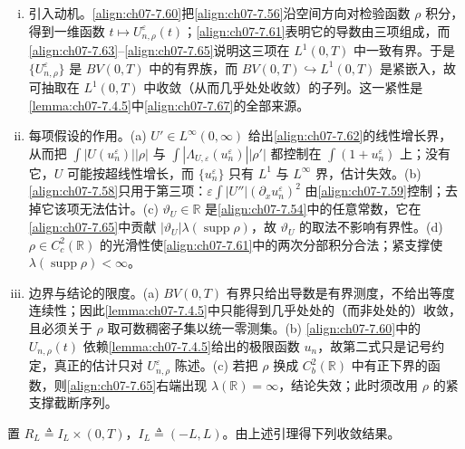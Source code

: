 ﻿\documentclass[../../main.tex]{subfiles}%
\begin{document}
\begin{remark}\label{remark:ch07-7.4.4BV}
\begin{enumerate}[(i)]
\item 引入动机。\eqref{align:ch07-7.60}把\eqref{align:ch07-7.56}沿空间方向对检验函数 $\rho$ 积分，得到一维函数 $t\mapsto U_{n,\rho}^\varepsilon(t)$；\eqref{align:ch07-7.61}表明它的导数由三项组成，而\eqref{align:ch07-7.63}--\eqref{align:ch07-7.65}说明这三项在 $L^1(0,T)$ 中一致有界。于是 $\{U_{n,\rho}^\varepsilon\}$ 是 $BV(0,T)$ 中的有界族，而 $BV(0,T)\hookrightarrow L^1(0,T)$ 是紧嵌入，故可抽取在 $L^1(0,T)$ 中收敛（从而几乎处处收敛）的子列。这一紧性是\cref{lemma:ch07-7.4.5}中\eqref{align:ch07-7.67}的全部来源。
\item 每项假设的作用。(a) $U'\in L^\infty(0,\infty)$ 给出\eqref{align:ch07-7.62}的线性增长界，从而把 $\int|U(u_n^\varepsilon)||\rho|$ 与 $\int|\Lambda_{U,\varepsilon}(u_n^\varepsilon)||\rho'|$ 都控制在 $\int(1+u_n^\varepsilon)$ 上；没有它，$U$ 可能按超线性增长，而 $\{u_n^\varepsilon\}$ 只有 $L^1$ 与 $L^\infty$ 界，估计失效。(b) \eqref{align:ch07-7.58}只用于第三项：$\varepsilon\int|U''|(\partial_xu_n^\varepsilon)^2$ 由\eqref{align:ch07-7.59}控制；去掉它该项无法估计。(c) $\vartheta_U\in\mathbb{R}$ 是\eqref{align:ch07-7.54}中的任意常数，它在\eqref{align:ch07-7.65}中贡献 $|\vartheta_U|\lambda(\operatorname{supp}\rho)$，故 $\vartheta_U$ 的取法不影响有界性。(d) $\rho\in C^2_c(\mathbb{R})$ 的光滑性使\eqref{align:ch07-7.61}中的两次分部积分合法；紧支撑使 $\lambda(\operatorname{supp}\rho)<\infty$。
\item 边界与结论的限度。(a) $BV(0,T)$ 有界只给出导数是有界测度，不给出等度连续性；因此\cref{lemma:ch07-7.4.5}中只能得到几乎处处的（而非处处的）收敛，且必须关于 $\rho$ 取可数稠密子集以统一零测集。(b) \eqref{align:ch07-7.60}中的 $U_{n,\rho}(t)$ 依赖\cref{lemma:ch07-7.4.5}给出的极限函数 $u_n$，故第二式只是记号约定，真正的估计只对 $U_{n,\rho}^\varepsilon$ 陈述。(c) 若把 $\rho$ 换成 $C^2_b(\mathbb{R})$ 中有正下界的函数，则\eqref{align:ch07-7.65}右端出现 $\lambda(\mathbb{R})=\infty$，结论失效；此时须改用 $\rho$ 的紧支撑截断序列。
\end{enumerate}
\end{remark}
置 $R_L\triangleq I_L\times(0,T)$，$I_L\triangleq(-L,L)$。由上述引理得下列收敛结果。
\end{document}
